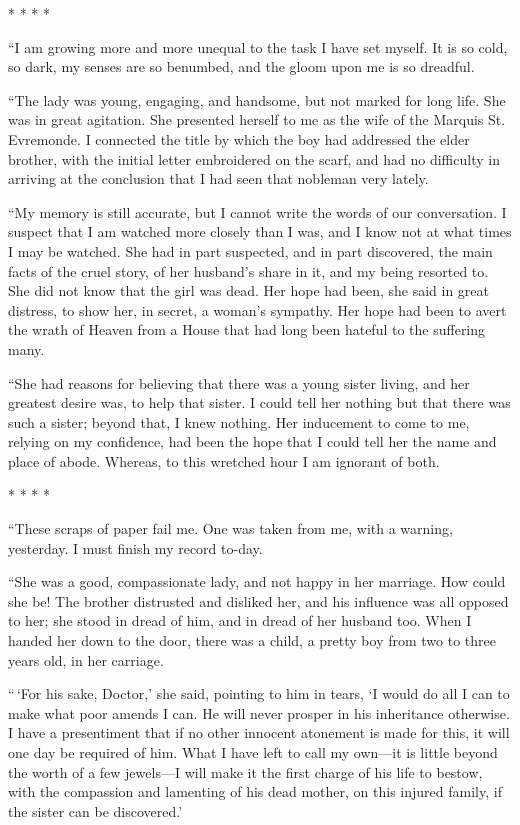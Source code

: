 * * * *

``I am growing more and more unequal to the task I have set myself.
It is so cold, so dark, my senses are so benumbed, and the gloom upon
me is so dreadful.

``The lady was young, engaging, and handsome, but not marked for long
life.  She was in great agitation.  She presented herself to me as
the wife of the Marquis St. Evremonde.  I connected the title by
which the boy had addressed the elder brother, with the initial
letter embroidered on the scarf, and had no difficulty in arriving at
the conclusion that I had seen that nobleman very lately.

``My memory is still accurate, but I cannot write the words of our
conversation.  I suspect that I am watched more closely than I was,
and I know not at what times I may be watched.  She had in part
suspected, and in part discovered, the main facts of the cruel story,
of her husband's share in it, and my being resorted to.  She did not
know that the girl was dead.  Her hope had been, she said in great
distress, to show her, in secret, a woman's sympathy.  Her hope had
been to avert the wrath of Heaven from a House that had long been
hateful to the suffering many.

``She had reasons for believing that there was a young sister living,
and her greatest desire was, to help that sister.  I could tell her
nothing but that there was such a sister; beyond that, I knew nothing.
Her inducement to come to me, relying on my confidence, had been the
hope that I could tell her the name and place of abode.  Whereas,
to this wretched hour I am ignorant of both.

* * * *

``These scraps of paper fail me.  One was taken from me, with a
warning, yesterday.  I must finish my record to-day.

``She was a good, compassionate lady, and not happy in her marriage.
How could she be!  The brother distrusted and disliked her, and his
influence was all opposed to her; she stood in dread of him, and in
dread of her husband too.  When I handed her down to the door, there
was a child, a pretty boy from two to three years old, in her carriage.

``\,`For his sake, Doctor,' she said, pointing to him in tears, `I would
do all I can to make what poor amends I can.  He will never prosper
in his inheritance otherwise.  I have a presentiment that if no other
innocent atonement is made for this, it will one day be required of
him.  What I have left to call my own---it is little beyond the worth
of a few jewels---I will make it the first charge of his life to
bestow, with the compassion and lamenting of his dead mother, on this
injured family, if the sister can be discovered.'

